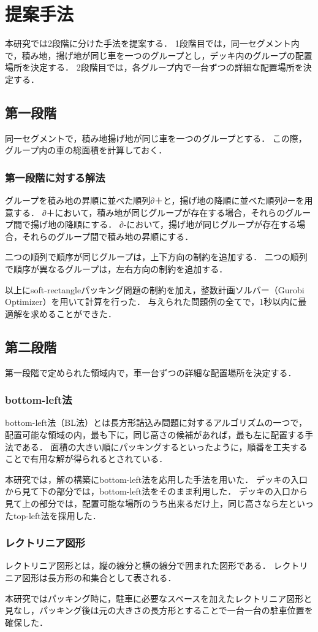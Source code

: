 \chapter{提案手法}\label{method}
本研究では2段階に分けた手法を提案する．
1段階目では，同一セグメント内で，積み地，揚げ地が同じ車を一つのグループとし，デッキ内のグループの配置場所を決定する．
2段階目では，各グループ内で一台ずつの詳細な配置場所を決定する．


\section{第一段階}
同一セグメントで，積み地揚げ地が同じ車を一つのグループとする．
この際，グループ内の車の総面積を計算しておく．

\subsection{第一段階に対する解法}
グループを積み地の昇順に並べた順列∂＋と，揚げ地の降順に並べた順列∂ーを用意する．
∂＋において，積み地が同じグループが存在する場合，それらのグループ間で揚げ地の降順にする．
∂-において，揚げ地が同じグループが存在する場合，それらのグループ間で積み地の昇順にする．

二つの順列で順序が同じグループは，上下方向の制約を追加する．
二つの順列で順序が異なるグループは，左右方向の制約を追加する．

以上にsoft-rectangleパッキング問題の制約を加え，整数計画ソルバー（Gurobi Optimizer）を用いて計算を行った．
与えられた問題例の全てで，1秒以内に最適解を求めることができた．


\section{第二段階}
第一段階で定められた領域内で，車一台ずつの詳細な配置場所を決定する．

\subsection{bottom-left法}
bottom-left法（BL法）とは長方形詰込み問題に対するアルゴリズムの一つで，配置可能な領域の内，最も下に，同じ高さの候補があれば，最も左に配置する手法である．
面積の大きい順にパッキングするといったように，順番を工夫することで有用な解が得られるとされている．

本研究では，解の構築にbottom-left法を応用した手法を用いた．
デッキの入口から見て下の部分では，bottom-left法をそのまま利用した．
デッキの入口から見て上の部分では，配置可能な場所のうち出来るだけ上，同じ高さなら左といったtop-left法を採用した．



\subsection{レクトリニア図形}
レクトリニア図形とは，縦の線分と横の線分で囲まれた図形である．
レクトリニア図形は長方形の和集合として表される．

本研究ではパッキング時に，駐車に必要なスペースを加えたレクトリニア図形と見なし，パッキング後は元の大きさの長方形とすることで一台一台の駐車位置を確保した．
